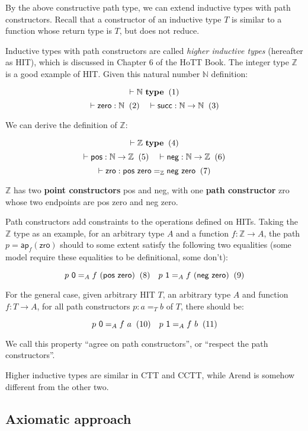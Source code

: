 By the above constructive path type,
we can extend inductive types with path constructors.
Recall that a constructor of an inductive type $T$ is
similar to a function whose return type is $T$,
but does not reduce.

Inductive types with path constructors are called
\textit{higher inductive types} (hereafter as HIT),
which is discussed in Chapter 6 of the HoTT Book.
The integer type $\mathbb Z$ is a good example of HIT.
Given this natural number $\mathbb N$ definition:

\[
  \vdash \mathbb N \ \textbf{type}
  \xtag
\]
\[
  \vdash \textsf{zero} : \mathbb N
  \xtag
  \quad
  \vdash \textsf{succ} : \mathbb N \rightarrow \mathbb N
  \xtag
\]

We can derive the definition of $\mathbb Z$:

\[
  \vdash \mathbb Z \ \textbf{type}
  \xtag
\]
\[
  \vdash \textsf{pos} : \mathbb N \rightarrow \mathbb Z
  \xtag
  \quad
  \vdash \textsf{neg} : \mathbb N \rightarrow \mathbb Z
  \xtag
\]
\[
  \vdash \textsf{zro} :
  \textsf{pos zero} =_{\mathbb Z} \textsf{neg zero}
  \xtag
\]

$\mathbb Z$ has two \textbf{point constructors}
\textsf{pos} and \textsf{neg}, with one \textbf{path constructor}
\textsf{zro} whose two endpoints are \textsf{pos zero} and \textsf{neg zero}.

Path constructors add constraints to the operations defined on HITs.
Taking the $\mathbb Z$ type as an example,
for an arbitrary type $A$ and a function $f : \mathbb Z \rightarrow A$,
the path $p = \textsf{ap}_f(\textsf{zro})$ should to some extent
satisfy the following two equalities
(some model require these equalities to be definitional, some don't):

\[
  p\ \textsf 0 =_A f\ (\textsf{pos zero})
  \xtag
  \quad
  p\ \textsf 1 =_A f\ (\textsf{neg zero})
  \xtag
\]

For the general case, given arbitrary HIT $T$, an arbitrary type $A$ and
function $f : T \rightarrow A$, for all path constructors
$p : a =_T b$ of $T$, there should be:

\[
  p\ \textsf 0 =_A f\ a
  \xtag
  \quad
  p\ \textsf 1 =_A f\ b
  \xtag
\]

We call this property ``agree on path constructors'',
or ``respect the path constructors''.

Higher inductive types are similar in CTT and CCTT,
while Arend is somehow different from the other two.

\subsection{Axiomatic approach}

